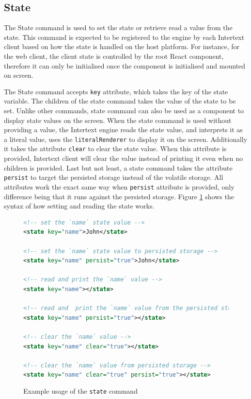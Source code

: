 \subsection{State}

The State command is used to set the state or retrieve read a value from the state. This command is expected to be registered to the engine by each Intertext client based on how the state is handled on the host platform. For instance, for the web client, the client state is controlled by the root React component, therefore it can only be initialised once the component is initialised and mounted on screen. 

The State command accepts \texttt{key} attribute, which takes the key of the state variable. The children of the state command takes the value of the state to be set. Unlike other commands, state command can also be used as a component to display state values on the screen. When the state command is used without providing a value, the Intertext engine reads the state value, and interprets it as a literal value, uses the \texttt{literalRenderer} to display it on the screen. Additionally it takes the attribute \texttt{clear} to clear the state value. When this attribute is provided, Intertext client will clear the value instead of printing it even when no children is provided. Last but not least, a state command takes the attribute \texttt{persist} to target the persisted storage instead of the volatile storage. All attributes work the exact same way when \texttt{persist} attribute is provided, only difference being that it runs against the persisted storage. Figure \ref{fig:how_state_is_set_and_read} shows the syntax of how setting and reading the state works.

\begin{figure}[htb]
\begin{minipage}{\linewidth}
\begin{lstlisting}[language=xml]
<!-- set the `name` state value -->
<state key="name">John</state>

<!-- set the `name` state value to persisted storage -->
<state key="name" persist="true">John</state>

<!-- read and print the `name` value -->
<state key="name"></state>

<!-- read and  print the `name` value from the persisted storage -->
<state key="name" persist="true"></state>

<!-- clear the `name` value -->
<state key="name" clear="true"></state>

<!-- clear the `name` value from persisted storage -->
<state key="name" clear="true" persist="true"></state>
\end{lstlisting}

\end{minipage}
\caption{Example usage of the \texttt{state} command}%
\label{fig:how_state_is_set_and_read}%
\end{figure}

